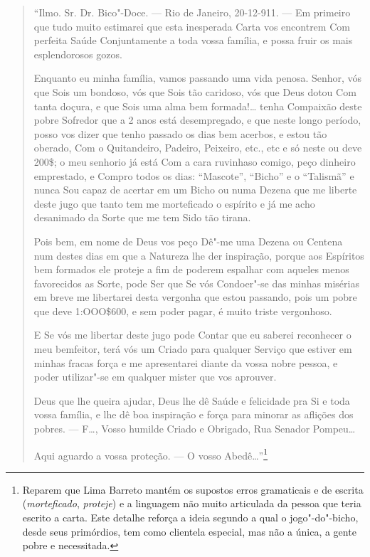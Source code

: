 \begin{quote}
``Ilmo. Sr. Dr. Bico"-Doce. --- Rio de Janeiro, 20-12-911. --- Em primeiro
que tudo muito estimarei que esta inesperada Carta vos encontrem Com
perfeita Saúde Conjuntamente a toda vossa família, e possa fruir os mais
esplendorosos gozos.

Enquanto eu minha família, vamos passando uma vida penosa. Senhor, vós
que Sois um bondoso, vós que Sois tão caridoso, vós que Deus dotou Com
tanta doçura, e que Sois uma alma bem formada!\ldots{} tenha Compaixão
deste pobre Sofredor que a 2 anos está desempregado, e que neste longo
período, posso vos dizer que tenho passado os dias bem acerbos, e estou
tão oberado, Com o Quitandeiro, Padeiro, Peixeiro, etc., etc e só neste
ou deve 200\$; o meu senhorio já está Com a cara ruvinhaso comigo, peço
dinheiro emprestado, e Compro todos os dias: ``Mascote'', ``Bicho'' e o
``Talismã'' e nunca Sou capaz de acertar em um Bicho ou numa Dezena que
me liberte deste jugo que tanto tem me morteficado o espírito e já me
acho desanimado da Sorte que me tem Sido tão tirana.

Pois bem, em nome de Deus vos peço Dê"-me uma Dezena ou Centena num
destes dias em que a Natureza lhe der inspiração, porque aos Espíritos
bem formados ele proteje a fim de poderem espalhar com aqueles menos
favorecidos as Sorte, pode Ser que Se vós Condoer"-se das minhas misérias
em breve me libertarei desta vergonha que estou passando, pois um pobre
que deve 1:OOO\$600, e sem poder pagar, é muito triste vergonhoso.

E Se vós me libertar deste jugo pode Contar que eu saberei reconhecer o
meu bemfeitor, terá vós um Criado para qualquer Serviço que estiver em
minhas fracas força e me apresentarei diante da vossa nobre pessoa, e
poder utilizar"-se em qualquer mister que vos aprouver.

Deus que lhe queira ajudar, Deus lhe dê Saúde e felicidade pra Si e toda
vossa família, e lhe dê boa inspiração e força para minorar as aflições
dos pobres. --- F\ldots{}, Vosso humilde Criado e Obrigado, Rua Senador
Pompeu\ldots{}

Aqui aguardo a vossa proteção. --- O vosso Abedê\ldots{}''\footnote{Reparem
  que Lima Barreto mantém os supostos erros gramaticais e de escrita
  (\emph{morteficado}, \emph{proteje}) e a linguagem não muito
  articulada da pessoa que teria escrito a carta. Este detalhe reforça a
  ideia segundo a qual o jogo"-do"-bicho, desde seus primórdios, tem como
  clientela especial, mas não a única, a gente pobre e necessitada.}
\end{quote}

